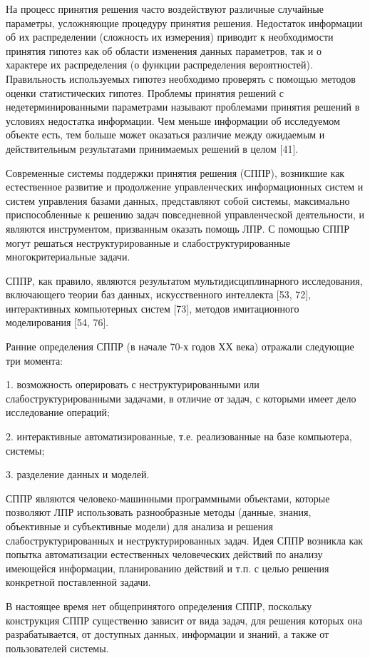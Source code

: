 \documentclass{article}
\begin{document}
На процесс принятия решения часто воздействуют 
различные случайные параметры, усложняющие 
процедуру принятия решения. Недостаток информации 
об их распределении (сложность их измерения) 
приводит к необходимости принятия гипотез 
как об области  изменения данных параметров, 
так и о характере их распределения (о функции 
распределения вероятностей). Правильность 
используемых гипотез необходимо проверять 
с помощью методов оценки статистических гипотез. 
Проблемы принятия решений с недетерминированными 
параметрами называют проблемами принятия решений 
в условиях недостатка информации. Чем меньше 
информации об исследуемом объекте есть, тем 
больше может оказаться различие между ожидаемым 
и действительным результатами принимаемых 
решений в целом [41]. 

Современные системы поддержки принятия решения 
(СППР), возникшие как естественное развитие 
и продолжение управленческих информационных 
систем и систем управления базами данных, представляют 
собой системы, максимально приспособленные 
к решению задач повседневной управленческой 
деятельности, и являются инструментом, призванным 
оказать помощь ЛПР. С помощью СППР могут решаться 
неструктурированные и слабоструктурированные 
многокритериальные задачи.

СППР, как правило, являются результатом мультидисциплинарного 
исследования, включающего теории баз данных, 
искусственного интеллекта [53, 72], интерактивных 
компьютерных систем [73], методов имитационного 
моделирования [54, 76].

Ранние определения СППР (в начале 70-х годов 
ХХ века) отражали следующие три момента: 

1. возможность оперировать с неструктурированными 
или слабоструктурированными задачами, в отличие 
от задач, с которыми имеет дело исследование 
операций; 

2. интерактивные автоматизированные, т.е. реализованные 
на базе компьютера, системы; 

3. разделение данных и моделей. 

СППР являются человеко-машинными программными 
объектами, которые позволяют ЛПР использовать 
разнообразные методы (данные, знания, объективные 
и субъективные модели) для анализа и решения 
слабоструктурированных и неструктурированных 
задач. Идея СППР возникла как попытка автоматизации 
естественных человеческих действий по анализу 
имеющейся информации, планированию действий 
и т.п. с целью решения конкретной поставленной 
задачи.

В настоящее время нет общепринятого определения 
СППР, поскольку конструкция СППР существенно 
зависит от вида задач, для решения которых она 
разрабатывается, от доступных данных, информации 
и знаний, а также от пользователей системы. 
\end{document}
